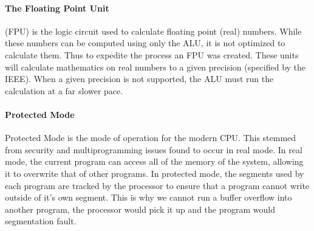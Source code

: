 				\paragraph{The Floating Point Unit}
					(FPU) is the logic circuit used to calculate floating point (real) numbers. 
					While these numbers can be computed using only the ALU, it is not optimized to calculate them.
					Thus to expedite the process an FPU was created. 
					These units will calculate mathematics on real numbers to a given precision (specified by the IEEE). %
					When a given precision is not supported, the ALU must run the calculation at a far slower pace. 
				\paragraph{Protected Mode} 
					Protected Mode is the mode of operation for the modern CPU. 
					This stemmed from security and multiprogramming issues found to occur in real mode. 
					In real mode, the current program can access all of the memory of the system, allowing it to overwrite that of other programs. 
					In protected mode, the segments used by each program are tracked by the processor to ensure that a program cannot write outside of it's own segment. 
					This is why we cannot run a buffer overflow into another program, the processor would pick it up and the program would segmentation fault. 
